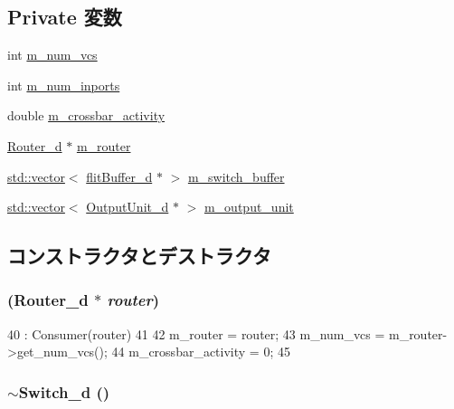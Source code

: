 \subsection*{Private 変数}
\begin{DoxyCompactItemize}
\item 
int \hyperlink{classSwitch__d_a2e1a9213321dfa0386cdedaf6fc22996}{m\_\-num\_\-vcs}
\item 
int \hyperlink{classSwitch__d_a260af5f608c447554a07e3d62bf6b9f7}{m\_\-num\_\-inports}
\item 
double \hyperlink{classSwitch__d_a071dcdc9a77462a1b3f8be023ced7fd7}{m\_\-crossbar\_\-activity}
\item 
\hyperlink{classRouter__d}{Router\_\-d} $\ast$ \hyperlink{classSwitch__d_a81d53a65b375007289068e764da769d8}{m\_\-router}
\item 
\hyperlink{classstd_1_1vector}{std::vector}$<$ \hyperlink{classflitBuffer__d}{flitBuffer\_\-d} $\ast$ $>$ \hyperlink{classSwitch__d_ac37e8b09e57f852adbe0ff4022c63930}{m\_\-switch\_\-buffer}
\item 
\hyperlink{classstd_1_1vector}{std::vector}$<$ \hyperlink{classOutputUnit__d}{OutputUnit\_\-d} $\ast$ $>$ \hyperlink{classSwitch__d_ab8b34c9f5479c61b8022de1aad185bae}{m\_\-output\_\-unit}
\end{DoxyCompactItemize}


\subsection{コンストラクタとデストラクタ}
\hypertarget{classSwitch__d_a0e97dda09012c1510a1ccc7ec35472f6}{
\subsubsection[{Switch\_\-d}]{ ({\bf Router\_\-d} $\ast$ {\em router})}}
\label{classSwitch__d_a0e97dda09012c1510a1ccc7ec35472f6}



\begin{DoxyCode}
40     : Consumer(router)
41 {
42     m_router = router;
43     m_num_vcs = m_router->get_num_vcs();
44     m_crossbar_activity = 0;
45 }
\end{DoxyCode}
\hypertarget{classSwitch__d_a299b8d72ed88cc460722fe8c461446cd}{
\subsubsection[{$\sim$Switch\_\-d}]{\setlength{\rightskip}{0pt plus 5cm}$\sim${\bf Switch\_\-d} ()}}
\label{classSwitch__d_a299b8d72ed88cc460722fe8c461446cd}



